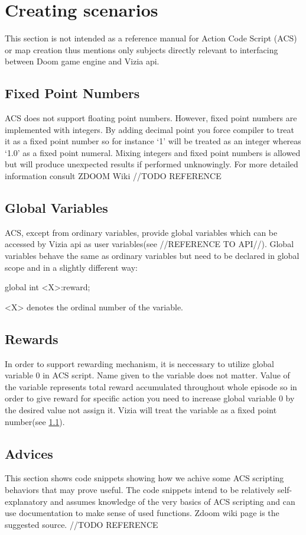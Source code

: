 \section{Creating scenarios}\label{sec:creating_scenarios}
	This section is not intended as a reference manual for Action Code Script (ACS) or map creation thus mentions only subjects directly relevant to interfacing between Doom game engine and Vizia api.


	\subsection{Fixed Point Numbers}\label{subsec:fixed_point}
		ACS does not support floating point numbers. However, fixed point numbers are implemented with integers. By adding decimal point you force compiler to treat it as a fixed point number so for instance `1' will be treated as an integer whereas `1.0' as a fixed point numeral. Mixing integers and fixed point numbers is allowed but will produce unexpected results if performed unknowingly. For more detailed information consult ZDOOM Wiki //TODO REFERENCE

	\subsection{Global Variables}\label{subsec:global_variable}
		ACS, except from ordinary variables, provide global variables which can be accessed by Vizia api as user variables(see //REFERENCE TO API//). Global variables behave the same as ordinary variables but need to be declared in global scope and in a slightly different way:
		\begin{clinee}[language=C++]
global int <X>:reward;
		\end{clinee}
		<X> denotes the ordinal number of the variable.
		
	\subsection{Rewards}
		In order to support rewarding mechanism, it is neccessary to utilize global variable 0 in ACS script. Name given to the variable does not matter. Value of the variable represents total reward accumulated throughout whole episode so in order to give reward for specific action you need to increase global variable 0 by the desired value not assign it. Vizia will treat the variable as a fixed point number(see \ref{subsec:fixed_point}).

	\subsection{Advices}
		This section shows code snippets showing how we achive some ACS scripting behaviors that may prove useful. The code snippets intend to be relatively self-explanatory and assumes knowledge of the very basics of ACS scripting and can use documentation to make sense of used functions. Zdoom wiki page is the suggested source. //TODO REFERENCE

